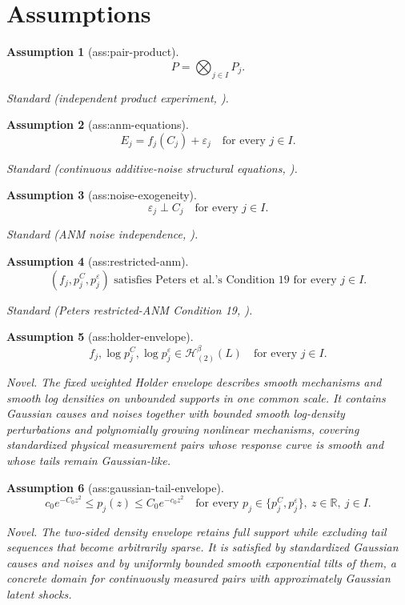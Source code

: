 \documentclass{article}
\newtheorem{assumption}{Assumption}
\begin{document}
\section{Assumptions}

\begin{assumption}[ass:pair-product]\label{ass:pair-product}
\[P=\bigotimes_{j\in I}P_j.\]
\par\smallskip\noindent\emph{Standard} (independent product experiment, \cite{Tsybakov2009}).
\end{assumption}

\begin{assumption}[ass:anm-equations]\label{ass:anm-equations}
\[E_j=f_j(C_j)+\varepsilon_j\quad\text{for every }j\in I.\]
\par\smallskip\noindent\emph{Standard} (continuous additive-noise structural equations, \cite{PetersMJS2014}).
\end{assumption}

\begin{assumption}[ass:noise-exogeneity]\label{ass:noise-exogeneity}
\[\varepsilon_j\perp C_j\quad\text{for every }j\in I.\]
\par\smallskip\noindent\emph{Standard} (ANM noise independence, \cite{PetersMJS2014}).
\end{assumption}

\begin{assumption}[ass:restricted-anm]\label{ass:restricted-anm}
\[(f_j,p^C_j,p^\varepsilon_j)\text{ satisfies Peters et al.'s Condition 19 for every }j\in I.\]
\par\smallskip\noindent\emph{Standard} (Peters restricted-ANM Condition 19, \cite{PetersMJS2014}).
\end{assumption}

\begin{assumption}[ass:holder-envelope]\label{ass:holder-envelope}
\[f_j,\log p^C_j,\log p^\varepsilon_j\in\mathcal H_{(2)}^\beta(L)\quad\text{for every }j\in I.\]
\par\smallskip\noindent\emph{Novel.} The fixed weighted Holder envelope describes smooth mechanisms and smooth log densities on unbounded supports in one common scale. It contains Gaussian causes and noises together with bounded smooth log-density perturbations and polynomially growing nonlinear mechanisms, covering standardized physical measurement pairs whose response curve is smooth and whose tails remain Gaussian-like.
\end{assumption}

\begin{assumption}[ass:gaussian-tail-envelope]\label{ass:gaussian-tail-envelope}
\[c_0e^{-C_0z^2}\le p_j(z)\le C_0e^{-c_0z^2}\quad\text{for every }p_j\in\{p^C_j,p^\varepsilon_j\},\ z\in\mathbb R,\ j\in I.\]
\par\smallskip\noindent\emph{Novel.} The two-sided density envelope retains full support while excluding tail sequences that become arbitrarily sparse. It is satisfied by standardized Gaussian causes and noises and by uniformly bounded smooth exponential tilts of them, a concrete domain for continuously measured pairs with approximately Gaussian latent shocks.
\end{assumption}
\end{document}
